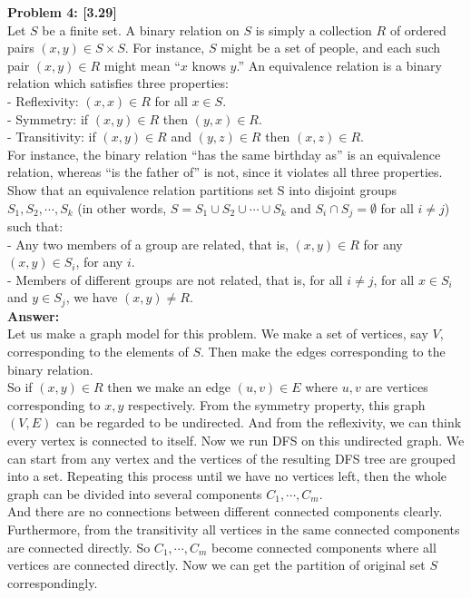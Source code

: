 \documentclass{article}
\begin{document}
\noindent
{\bf Problem 4: [3.29]}\\
Let $S$ be a finite set. A binary relation on $S$ is simply a collection $R$ of ordered pairs $(x, y) \in S \times S$. For instance, $S$ might be a set of people, and each such pair $(x, y)\in R$ might mean “$x$ knows $y$.” An equivalence relation is a binary relation which satisfies three properties:\\
- Reflexivity: $(x, x)\in R$ for all $x\in S$.\\
- Symmetry: if $(x, y)\in R$ then $(y, x)\in R$.\\
- Transitivity: if $(x, y)\in R$ and $(y, z)\in R$ then $(x, z)\in R$.\\
For instance, the binary relation “has the same birthday as” is an equivalence relation, whereas “is the father of” is not, since it violates all three properties.
Show that an equivalence relation partitions set S into disjoint groups $S_1, S_2, \cdots ,S_k$ (in other words, $S = S_1 \cup S_2 \cup \cdots \cup S_k$ and $S_i \cap S_j = \emptyset$ for all $i \neq j$) such that:\\
- Any two members of a group are related, that is, $(x, y) \in R$ for any $(x, y)\in S_i$, for any $i$.\\
- Members of different groups are not related, that is, for all $i \neq j$, for all $x \in S_i$ and $y \in S_j$, we have $(x, y) \neq R$.\\
{\bf Answer:}\\
Let us make a graph model for this problem. 
We make a set of vertices, say $V$, corresponding to the elements of $S$. 
Then make the edges corresponding to the binary relation.\\
 So if $(x,y)\in R$ then we make an edge $(u, v)\in E$ where $u, v$ are vertices corresponding to $x, y$ respectively. From the symmetry property, this graph $(V,E)$ can be regarded to be undirected. And from the reflexivity, we can think every vertex is connected to itself.
Now we run DFS on this undirected graph. We can start from any vertex and the vertices of the resulting DFS tree are grouped into a set. Repeating this process until we have no vertices left, then the whole graph can be divided into several components $C_1, \cdots, C_m$. \\
And there are no connections between different connected components clearly. \\
Furthermore, from the transitivity all vertices in the same connected components are connected directly. So $C_1, \cdots, C_m$ become connected components where all vertices are connected directly. Now we can get the partition of original set $S$ correspondingly.
\pagebreak
\pagebreak
\pagebreak
\pagebreak
\end{document}
